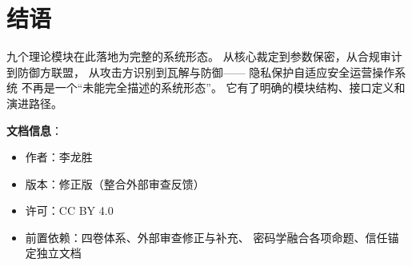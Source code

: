 \documentclass[11pt,a4paper]{article}
\begin{document}
\section{结语}

九个理论模块在此落地为完整的系统形态。
从核心裁定到参数保密，从合规审计到防御方联盟，
从攻击方识别到瓦解与防御——
隐私保护自适应安全运营操作系统
不再是一个“未能完全描述的系统形态”。
它有了明确的模块结构、接口定义和演进路径。

\vspace{5mm}
\noindent\textbf{文档信息}：
\begin{itemize}
    \item 作者：李龙胜
    \item 版本：修正版（整合外部审查反馈）
    \item 许可：CC BY 4.0
    \item 前置依赖：四卷体系、外部审查修正与补充、
          密码学融合各项命题、信任锚定独立文档
\end{itemize}
\end{document}
